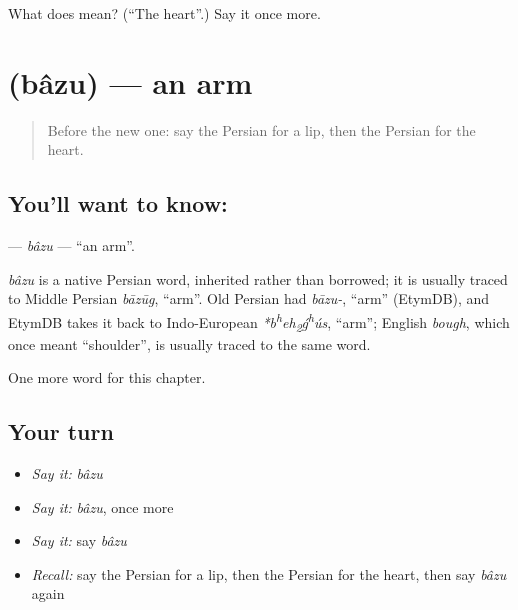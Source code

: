 \begin{tcolorbox}[breakable,colback=teal!4,colframe=teal!35!black,title={Before you move on}]
What does  mean? (\textquotedblleft{}The heart\textquotedblright{}.) Say it once more.
\end{tcolorbox}
\section[\texorpdfstring{\fa{بازو} (bâzu)}{بازو (bâzu)}]{ (bâzu) — an arm}

\label{lesson:FA-C30-bazu}



\begin{quote}
Before the new one: say the Persian for a lip, then the Persian for the heart.
\end{quote}

\subsection*{You'll want to know: }
\textbf{} — \emph{bâzu} — \textquotedblleft{}an arm\textquotedblright{}.

\begin{cousinweb}
\emph{bâzu} is a native Persian word, inherited rather than borrowed; it is usually traced to Middle Persian \emph{bāzūg}, \textquotedblleft{}arm\textquotedblright{}. Old Persian had \emph{bāzu-}, \textquotedblleft{}arm\textquotedblright{} (EtymDB), and EtymDB takes it back to Indo-European \emph{*b\textsuperscript{h}eh\textsubscript{2}ǵ\textsuperscript{h}ús}, \textquotedblleft{}arm\textquotedblright{}; English \emph{bough}, which once meant \textquotedblleft{}shoulder\textquotedblright{}, is usually traced to the same word.
\end{cousinweb}

\begin{grammarlens}[title={What you've built}]
One more word for this chapter.
\end{grammarlens}

\subsection*{Your turn}
\begin{itemize}
\raggedright
  \item \emph{Say it:} \emph{bâzu}
  \item \emph{Say it:} \emph{bâzu}, once more
  \item \emph{Say it:} say \emph{bâzu}
  \item \emph{Recall:} say the Persian for a lip, then the Persian for the heart, then say \emph{bâzu} again
\end{itemize}


